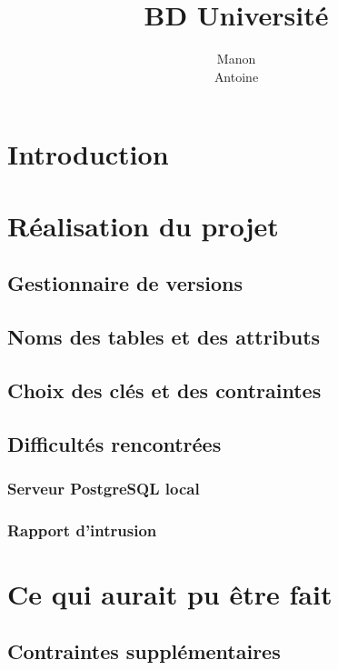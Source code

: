 \documentclass[12pt,titlepage,a4paper]{report}
\title{BD Université}
\author{Manon \bsc{Ansart}\\ Antoine \bsc{Augusti}}
\begin{document}

	\dominitoc
	\tableofcontents

	\chapter{Introduction}
		

	\chapter{Réalisation du projet}
		\section{Gestionnaire de versions}
		

		\section{Noms des tables et des attributs}
		

		\section{Choix des clés et des contraintes}
		

		
		\section{Difficultés rencontrées}
			\subsection{Serveur PostgreSQL local}
			
			
			\subsection{Rapport d'intrusion}
			

	\chapter{Ce qui aurait pu être fait}
		\section{Contraintes supplémentaires}
		
\end{document}
